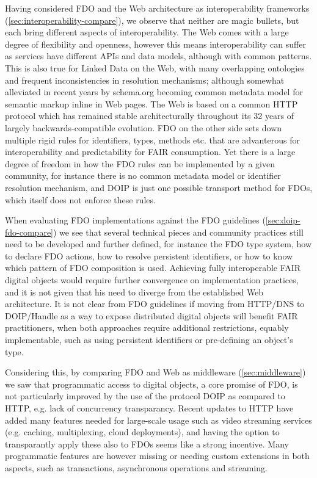 \documentclass[fleqn,10pt,NOlineno]{wlpeerjlua}
\begin{document}
Having considered FDO and the Web architecture as interoperability frameworks (\vref*{sec:interoperability-compare}), we observe that neither are magic bullets, but each bring different aspects of interoperability. The Web comes with a large degree of flexibility and openness, however this means interoperability can suffer as services have different APIs and data models, although with common patterns. This is also true for Linked Data on the Web, with many overlapping ontologies and frequent inconsistencies in resolution mechanisms; although somewhat alleviated in recent years by schema.org becoming common metadata model for semantic markup inline in Web pages. The Web is based on a common HTTP protocol which has remained stable architecturally throughout its 32 years of largely backwards-compatible evolution. FDO on the other side sets down multiple rigid rules for identifiers, types, methods etc. that are advanterous for interoperability and predictability for FAIR consumption. Yet there is a large degree of freedom in how the FDO rules can be implemented by a given community, for instance there is no common metadata model or identifier resolution mechanism, and DOIP is just one possible transport method for FDOs, which itself does not enforce these rules. 

When evaluating FDO implementations against the FDO guidelines (\vref*{sec:doip-fdo-compare}) we see that several technical pieces and community practices still need to be developed and further defined, for instance the FDO type system, how to declare FDO actions, how to resolve persistent identifiers, or how to know which pattern of FDO composition is used. Achieving fully interoperable FAIR digital objects would require further convergence on implementation practices, and it is not given that his need to diverge from the established Web architecture.  It is not clear from FDO guidelines if moving from HTTP/DNS to DOIP/Handle as a way to expose distributed digital objects will benefit FAIR practitioners, when both approaches require additional restrictions, equably implementable, such as using persistent identifiers or pre-defining an object's type. 

Considering this, by comparing FDO and Web as middleware (\vref*{sec:middleware}) we saw that programmatic access to digital objects, a core promise of FDO, is not particularly improved by the use of the protocol DOIP as compared to HTTP, e.g. lack of concurrency transparancy. Recent updates to HTTP have added many features needed for large-scale usage such as video streaming services (e.g. caching, multiplexing, cloud deployments), and having the option to transparantly apply these also to FDOs seems like a strong incentive. Many programmatic features are however missing or needing custom extensions in both aspects, such as transactions, asynchronous operations and streaming.
\end{document}
